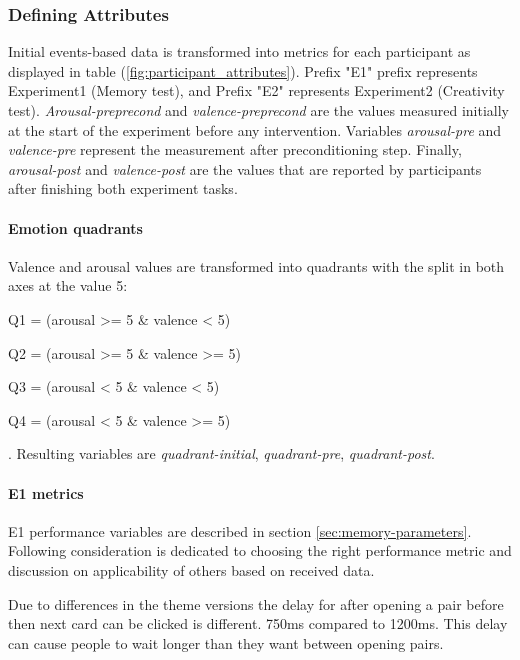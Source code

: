 	\subsubsection{Defining Attributes} Initial events-based data is transformed into metrics for each participant as displayed in table (\ref{fig:participant_attributes}). Prefix "E1" prefix represents Experiment1 (Memory test), and Prefix "E2" represents Experiment2 (Creativity test). \textit{Arousal-preprecond} and \textit{valence-preprecond} are the values measured initially at the start of the experiment before any intervention. Variables \textit{arousal-pre} and \textit{valence-pre} represent the measurement after preconditioning step. Finally, \textit{arousal-post} and \textit{valence-post} are the values that are reported by participants after finishing both experiment tasks.

	\paragraph{Emotion quadrants}
	
	Valence and arousal values are transformed into quadrants with the split in both axes at the value 5:
	\begin{enumerate*}
		\item Q1 = (arousal >= 5 \& valence  < 5)
		\item Q2 = (arousal >= 5 \& valence  >= 5)
		\item Q3 = (arousal < 5 \& valence  < 5)
		\item Q4 = (arousal < 5 \& valence  >= 5)
	\end{enumerate*}. Resulting variables are \textit{quadrant-initial}, \textit{quadrant-pre}, \textit{quadrant-post}.
	
	\paragraph{E1 metrics} \label{sec:e1metrics}
	
	E1 performance variables are described in section \ref{sec:memory-parameters}. Following consideration is dedicated to choosing the right performance metric and discussion on applicability of others based on received data.
	
	Due to differences in the theme versions the delay for after opening a pair before then next card can be clicked is different. 750ms compared to 1200ms. This delay can cause people to wait longer than they want between opening pairs.
	
